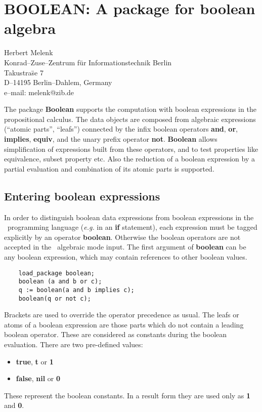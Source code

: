 \chapter{BOOLEAN: A package for boolean algebra} 
\label{BOOLEAN}

{\footnotesize
\begin{center}
Herbert Melenk\\
Konrad--Zuse--Zentrum f\"ur Informationstechnik Berlin \\
Takustra\"se 7 \\
D--14195 Berlin--Dahlem, Germany \\[0.05in]
e--mail:  melenk@zib.de
\end{center}
}

The package {\bf Boolean} supports the computation with boolean
expressions in the propositional calculus.  The data objects are
composed from algebraic expressions (``atomic parts'', ``leafs'')
connected by the infix boolean operators {\bf and}, {\bf or}, {\bf
implies}, {\bf equiv}, and the unary prefix operator {\bf not}.  {\bf
Boolean} allows simplification of expressions built from these
operators, and to test properties like equivalence, subset property
etc.  Also the reduction of a boolean expression by a partial
evaluation and combination of its atomic parts is supported.

\section{Entering boolean expressions}

In order to distinguish boolean data expressions from 
boolean expressions in the \REDUCE\ programming
language ({\em e.g.} in an {\bf if} statement), each expression
must be tagged explicitly by an operator {\bf boolean}.
Otherwise the boolean operators are not accepted in the
\REDUCE\  algebraic mode input.
The first argument of {\bf boolean} can be any boolean expression,
which may contain references to other boolean values.
\begin{verbatim}
    load_package boolean;
    boolean (a and b or c);
    q := boolean(a and b implies c);
    boolean(q or not c);
\end{verbatim}
Brackets are used to override the operator precedence as usual.
The leafs or atoms of a boolean expression are those parts which
do not contain a leading boolean operator.  These are
considered as constants during the boolean evaluation.  There
are two pre-defined values:
\begin{itemize}
\item {\bf true}, {\bf t} or {\bf 1}
\item {\bf false}, {\bf nil} or {\bf 0}
\end{itemize}
These represent the boolean constants.  In a result
form they are used only as {\bf 1} and {\bf 0}.

